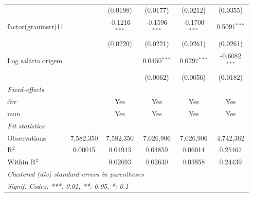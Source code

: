 \begin{tabular}{lccccc}
                            &                & (0.0198)                & (0.0177)                & (0.0212)                & (0.0355)\\   
   factor(grauinstr)11      &                & -0.1216$^{***}$         & -0.1596$^{***}$         & -0.1700$^{***}$         & 0.5091$^{***}$\\   
                            &                & (0.0220)                & (0.0221)                & (0.0261)                & (0.0261)\\   
   Log salário origem       &                &                         & 0.0450$^{***}$          & 0.0297$^{***}$          & -0.6082$^{***}$\\   
                            &                &                         & (0.0062)                & (0.0056)                & (0.0182)\\   
   \midrule
   \emph{Fixed-effects}\\
   div                      &                & Yes                     & Yes                     & Yes                     & Yes\\  
   mun                      &                & Yes                     & Yes                     & Yes                     & Yes\\  
   \midrule
   \emph{Fit statistics}\\
   Observations             & 7,582,350      & 7,582,350               & 7,026,906               & 7,026,906               & 4,742,362\\  
   R$^2$                    & 0.00015        & 0.04943                 & 0.04859                 & 0.06014                 & 0.25467\\  
   Within R$^2$             &                & 0.02693                 & 0.02640                 & 0.03858                 & 0.24439\\  
   \midrule \midrule
   \multicolumn{6}{l}{\emph{Clustered (div) standard-errors in parentheses}}\\
   \multicolumn{6}{l}{\emph{Signif. Codes: ***: 0.01, **: 0.05, *: 0.1}}\\
\end{tabular}
\par\endgroup


